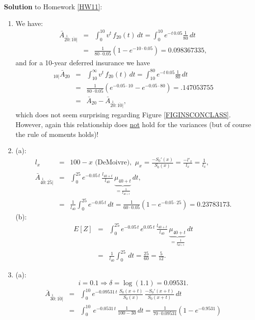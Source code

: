\documentclass[11pt,fleqn,oneside]{book}
\begin{document}
\noindent \textbf{Solution} to Homework \ref{HW11}:
\footnotesize
\begin{enumerate} 
\item We have:
\begin{eqnarray*}
{\bar{A}_{\stackrel{1}{20}:\overline{10}|}} &=& \int_0^{10} v^t\, f_{20}(t)\,dt = \int_0^{10} e^{-t\,0.05} \frac{1}{80}\,dt\\
&=& \frac{1}{80 \cdot 0.05} \left(1 - e^{-10\cdot 0.05}\right) = 0.098367335,
\end{eqnarray*}
and for a 10-year deferred insurance we have 
\begin{eqnarray*}
{_{10|}\bar{A}_{20}} &=& \int_{10}^{\infty} v^t\,f_{20}(t)\,dt = \int_{10}^{80} e^{-t\,0.05} \frac{1}{80}\,dt\\
&=& \frac{1}{80 \cdot 0.05} \left(e^{-0.05\cdot 10} - e^{-0.05\cdot 80}\right) = .147053755 \\
&=& \bar{A}_{20} - {\bar{A}_{\stackrel{1}{20}:\overline{10}|}},
\end{eqnarray*}
which does not seem surprising regarding Figure \ref{FIGINSCONCLASS}. However, again this relationship does \underline{not} hold for the variances (but of course the rule of moments holds)!
\item
(a):
\begin{eqnarray*}
l_x &=& 100 -x \text{ (DeMoivre)},\,\,\mu_x = \frac{-S_0'(x)}{S_0(x)} = \frac{-l'_x}{l_x} = \frac{1}{l_x}, \\
{\bar{A}_{\stackrel{1}{40}: \overline{25}|}} &=&
\int_0^{25} e^{-0.05\,t}\,\frac{l_{40+t}}{l_{40}}\, \underbrace{\mu_{40+t}}_{= \frac{1}{l_{40+t}}}\,dt,\\
&=& \frac{1}{l_{40}} \int_0^{25} e^{-0.05\,t}\,dt = \frac{1}{60\cdot 0.05} (1- e^{-0.05 \cdot 25}) =0.23783173.
\end{eqnarray*}
(b):
\begin{eqnarray*}
E[Z] &=& \int_0^{25} e^{-0.05\,t}\,e^{0.05\,t}\,\frac{l_{40+t}}{l_{40}}\, \underbrace{\mu_{40+t}}_{= \frac{1}{l_{40+t}}}\,dt \\
&=& \frac{1}{l_{40}} \int_0^{25}\,dt = \frac{25}{60} = \frac{5}{12}.
\end{eqnarray*}
\item (a):  
$$
i = 0.1 \Rightarrow  \delta = \log(1.1) = 0.09531.
$$
\begin{eqnarray*}
{\bar{A}_{\stackrel{1}{30}:\overline{10}|}} &=& \int_0^{10} e^{-0.09531\,t}\,\frac{S_0(x+t)}{S_0(x)}\,\frac{-S_0'(x+t)}{S_0(x+t)}\,dt\\
&=& \int_0^{10} \,e^{-0.0531\,t}\,\frac{1}{100-30}\,dt = \frac{1}{70 \cdot 0.09531} \left(1 - e^{-0.9531}\right)\\

\end{eqnarray*}
\end{enumerate}
\end{document}
